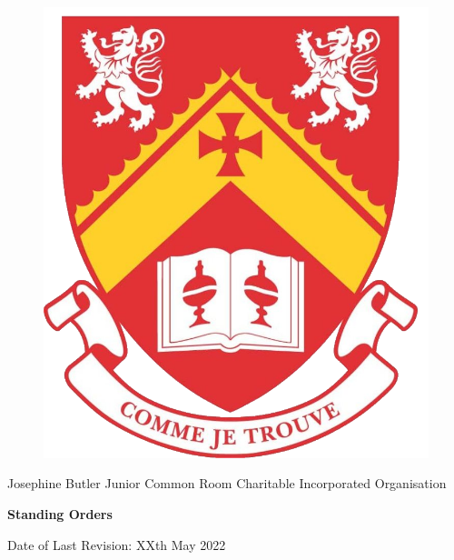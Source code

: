 \begin{titlepage}
    \AddToShipoutPicture*{\BackgroundPic}
    
    \begin{figure}[t]
    \includegraphics[scale=0.8]{Functional/Josephine_Butler_College_Crest.png}
    \centering
    \end{figure}
    
        \vspace*{1.0cm}    
        \begin{center}
            \begin{tcolorbox}[colback=red!5!white,colframe=red!75!black,text width=13cm]
                \begin{center}
                    
                    Josephine Butler Junior Common Room Charitable Incorporated Organisation
                    
                    \vspace{1cm}
                    
                    \textbf{\Huge{\color{myred}Standing Orders}}
                    
                    \vspace{1cm}
                    
                    Date of Last Revision: XXth May 2022
                    
                    \vfill
                \end{center}
            \end{tcolorbox}
        \end{center}
\end{titlepage}
